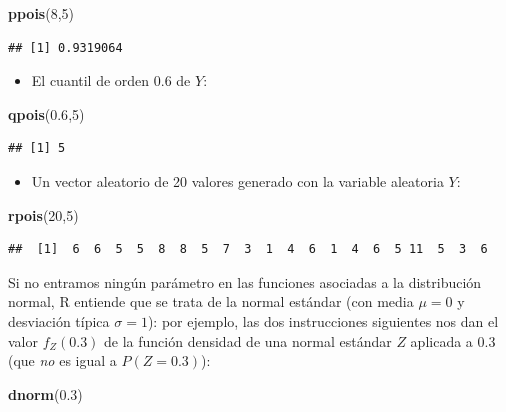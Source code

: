 \documentclass[]{book}
\newenvironment{Shaded}{\begin{snugshade}}{\end{snugshade}}
\newcommand{\DecValTok}[1]{\textcolor[rgb]{0.00,0.00,0.81}{#1}}
\newcommand{\FloatTok}[1]{\textcolor[rgb]{0.00,0.00,0.81}{#1}}
\newcommand{\KeywordTok}[1]{\textcolor[rgb]{0.13,0.29,0.53}{\textbf{#1}}}
\newcommand{\NormalTok}[1]{#1}
\providecommand{\tightlist}{%
  \setlength{\itemsep}{0pt}\setlength{\parskip}{0pt}}
\theoremstyle{definition}
\theoremstyle{definition}
\theoremstyle{definition}
\theoremstyle{remark}
\begin{document}
\begin{Shaded}
\begin{Highlighting}[]
\KeywordTok{ppois}\NormalTok{(}\DecValTok{8}\NormalTok{,}\DecValTok{5}\NormalTok{) }
\end{Highlighting}
\end{Shaded}

\begin{verbatim}
## [1] 0.9319064
\end{verbatim}

\begin{itemize}
\tightlist
\item
  El cuantil de orden 0.6 de \(Y\):
\end{itemize}

\begin{Shaded}
\begin{Highlighting}[]
\KeywordTok{qpois}\NormalTok{(}\FloatTok{0.6}\NormalTok{,}\DecValTok{5}\NormalTok{)}
\end{Highlighting}
\end{Shaded}

\begin{verbatim}
## [1] 5
\end{verbatim}

\begin{itemize}
\tightlist
\item
  Un vector aleatorio de 20 valores generado con la variable aleatoria \(Y\):
\end{itemize}

\begin{Shaded}
\begin{Highlighting}[]
\KeywordTok{rpois}\NormalTok{(}\DecValTok{20}\NormalTok{,}\DecValTok{5}\NormalTok{)}
\end{Highlighting}
\end{Shaded}

\begin{verbatim}
##  [1]  6  6  5  5  8  8  5  7  3  1  4  6  1  4  6  5 11  5  3  6
\end{verbatim}

Si no entramos ningún parámetro en las funciones asociadas a la distribución normal, R entiende que se trata de la normal estándar (con media \(\mu=0\) y desviación típica \(\sigma=1\)): por ejemplo, las dos instrucciones siguientes nos dan el valor \(f_Z(0.3)\) de la función densidad de una normal estándar \(Z\) aplicada a 0.3 (que \emph{no} es igual a \(P(Z=0.3)\)):

\begin{Shaded}
\begin{Highlighting}[]
\KeywordTok{dnorm}\NormalTok{(}\FloatTok{0.3}\NormalTok{)}
\end{Highlighting}
\end{Shaded}
\end{document}
